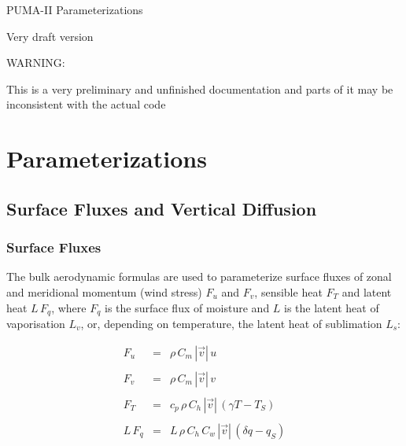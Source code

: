 %
\newcommand{\D}{\displaystyle}
%
\begin{center}
{\large PUMA-II Parameterizations} \\
\end{center}

\begin{center}
{\Large Very draft version} \\
\end{center}

\begin{center}
{\LARGE WARNING:} \\
\end{center}

\begin{center}
{\Large This is a very preliminary and unfinished
documentation and parts of it may be 
inconsistent with the actual code}
\end{center}

\newpage


\section{Parameterizations}

\subsection{Surface Fluxes and Vertical Diffusion}

\subsubsection{Surface Fluxes \label{surflux}}

The bulk aerodynamic formulas are used to
parameterize
surface
fluxes of zonal and meridional momentum (wind
stress)
$F_u$ and
$F_v$,
sensible heat $F_T$ and latent heat $L \, F_q$, where
$F_q$ is the surface flux of moisture and $L$ is the
latent heat of vaporisation $L_v$, or, depending on
temperature, the latent heat of sublimation $L_s$:

\begin{equation}\label{fluxes}
\begin{array}{rcl}
\D F_u   & = & \D \rho \, C_m \, |\vec{v}| \, u \\
&& \\
\D F_v   & = & \D \rho \, C_m \, |\vec{v}| \, v \\
&& \\
\D F_T   & = & \D c_p \, \rho \, C_h \, |\vec{v}|  \,
(\gamma
T
- T_S )  \\
&& \\
\D L \, F_q & = & \D L\, \rho \, C_h \, C_w \, |\vec{v}|
\, 
(\delta
q -  q_S )
\end{array}
\end{equation}

